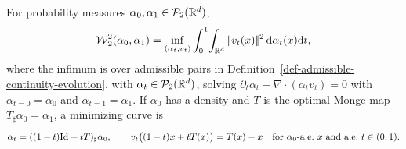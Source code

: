 \begin{thm}\label{thm-benamou-brenier}
	For probability measures $\alpha_0,\alpha_1\in\mathcal{P}_2(\mathbb{R}^d)$,
	\begin{equation}\label{eq:benamou-brenier}
	\operatorname{\mathcal{W}}_2^2(\alpha_0,\alpha_1)
	=
	\inf_{(\alpha_t,v_t)}
	\int_0^1\!\int_{\mathbb{R}^d}|\!| v_t(x) |\!|^2\,\mathrm{d}\alpha_t(x)\mathrm{d} t,
	\end{equation}
	where the infimum is over admissible pairs in Definition~\ref{def-admissible-continuity-evolution}, with $\alpha_t\in\mathcal{P}_2(\mathbb{R}^d)$, solving $\partial_t\alpha_t+\nabla\!\cdot(\alpha_t v_t)=0$ with $\alpha_{t=0}=\alpha_0$ and $\alpha_{t=1}=\alpha_1$. If $\alpha_0$ has a density and $T$ is the optimal Monge map $T_\sharp\alpha_0=\alpha_1$, a minimizing curve is
	\begin{equation}\label{eq:static-to-dynamic}
		\alpha_t=((1-t)\Id+tT)_\sharp\alpha_0,
		\qquad
		v_t\big((1-t)x+tT(x)\big)=T(x)-x
		\quad\text{for $\alpha_0$-a.e.\ $x$ and a.e.\ $t\in(0,1)$}.
	\end{equation}
\end{thm}

